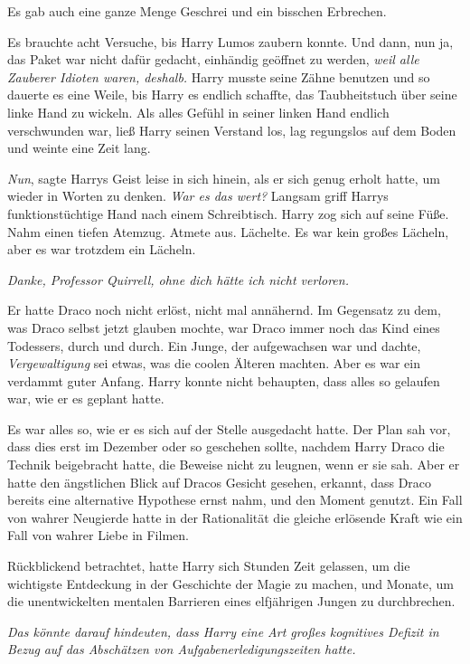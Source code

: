 Es gab auch eine ganze Menge Geschrei und ein bisschen Erbrechen.

Es brauchte acht Versuche, bis Harry Lumos zaubern konnte. Und dann, nun ja, das
Paket war nicht dafür gedacht, einhändig geöffnet zu werden, \emph{weil alle
Zauberer Idioten waren, deshalb.} Harry musste seine Zähne benutzen und so
dauerte es eine Weile, bis Harry es endlich schaffte, das Taubheitstuch über
seine linke Hand zu wickeln. Als alles Gefühl in seiner linken Hand endlich
verschwunden war, ließ Harry seinen Verstand los, lag regungslos auf dem Boden
und weinte eine Zeit lang.

\emph{Nun}, sagte Harrys Geist leise in sich hinein, als er sich genug erholt
hatte, um wieder in Worten zu denken.\emph{ War es das wert? } Langsam griff
Harrys funktionstüchtige Hand nach einem Schreibtisch. Harry zog sich auf seine
Füße. Nahm einen tiefen Atemzug. Atmete aus. Lächelte. Es war kein großes
Lächeln, aber es war trotzdem ein Lächeln.

\emph{ Danke, Professor Quirrell, ohne dich hätte ich nicht verloren.}

Er hatte Draco noch nicht erlöst, nicht mal annähernd. Im Gegensatz zu dem, was
Draco selbst jetzt glauben mochte, war Draco immer noch das Kind eines
Todessers, durch und durch. Ein Junge, der aufgewachsen war und dachte, \glqq
\emph{Vergewaltigung\grqq{} } sei etwas, was die coolen Älteren machten. Aber es
war ein verdammt guter Anfang. Harry konnte nicht behaupten, dass alles so
gelaufen war, wie er es geplant hatte.

Es war alles so, wie er es sich auf der Stelle ausgedacht hatte. Der Plan sah
vor, dass dies erst im Dezember oder so geschehen sollte, nachdem Harry Draco
die Technik beigebracht hatte, die Beweise nicht zu leugnen, wenn er sie sah.
Aber er hatte den ängstlichen Blick auf Dracos Gesicht gesehen, erkannt, dass
Draco bereits eine alternative Hypothese ernst nahm, und den Moment genutzt. Ein
Fall von wahrer Neugierde hatte in der Rationalität die gleiche erlösende Kraft
wie ein Fall von wahrer Liebe in Filmen.

Rückblickend betrachtet, hatte Harry sich Stunden Zeit gelassen, um die
wichtigste Entdeckung in der Geschichte der Magie zu machen, und Monate, um die
unentwickelten mentalen Barrieren eines elfjährigen Jungen zu durchbrechen.

\emph{Das könnte darauf hindeuten, dass Harry eine Art großes kognitives Defizit
in Bezug }\emph{auf das Abschätzen von Aufgabenerledigungszeiten hatte.}

